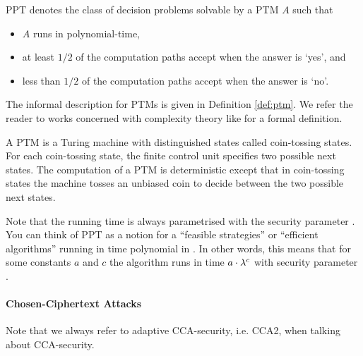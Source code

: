 \begin{definition}[\acl{PP}]\label{def:ppt}
\ac{PPT} denotes the class of decision problems solvable by a \ac{PTM} $A$ such that
\begin{itemize}
	\item $A$ runs in polynomial-time,
	\item at least $1/2$ of the computation paths accept when the answer is `yes', and
	\item less than $1/2$ of the computation paths accept when the answer is `no'.
\end{itemize}
\eod
\end{definition}

\noindent
The informal description for \aclp{PTM} is given in Definition \ref{def:ptm}.
We refer the reader to works concerned with complexity theory like \cite{santos1969,WaterlooComplexity} for a formal definition.

\begin{definition}\label{def:ptm}
A \ac{PTM} is a Turing machine with distinguished states called coin-tossing states.
For each coin-tossing state, the finite control unit specifies two possible next states.
The computation of a \ac{PTM} is deterministic except that in coin-tossing states the machine tosses an unbiased coin to decide between the two possible next states.
\end{definition}

\noindent
Note that the running time is always parametrised with the security parameter \secpar.
You can think of \ac{PPT} as a notion for a ``feasible strategies'' or ``efficient algorithms'' running in time polynomial in \secpar.
In other words, this means that for some constants $a$ and $c$ the algorithm runs in time $a\cdot \lambda^c$ with security parameter \secpar \cite{katz2008introduction}.

\paragraph{Chosen-Ciphertext Attacks}
Note that we always refer to adaptive \ac{CCA}-security, i.e. \ac{CCA}2, when talking about \ac{CCA}-security.

